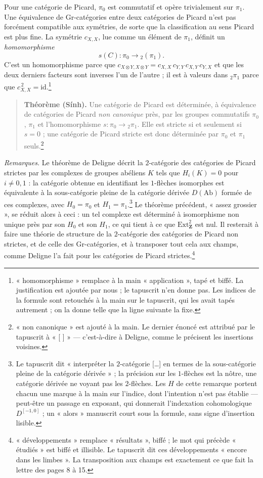 \documentclass[11pt,a4paper]{article}
\begin{document}
Pour une catégorie de Picard, $\pi_0$ est commutatif et opère trivialement
sur $\pi_1$. Une équivalence de Gr-catégories entre deux catégories de Picard
n'est pas forcément compatible aux symétries, de sorte que la classification
au sens Picard est plus fine. La symétrie $c_{X,X}$, lue comme un élément de
$\pi_1$, définit un \emph{homomorphisme}
\[ s(C) : \pi_0 \longrightarrow {}_2(\pi_1) . \]
C'est un homomorphisme parce que
$c_{X \otimes Y, X \otimes Y} = c_{X,X}\, c_{Y,Y}\, c_{X,Y}\, c_{Y,X}$ et que
les deux derniers facteurs sont inverses l'un de l'autre ; il est à valeurs
dans ${}_2\pi_1$ parce que $c_{X,X}^{\,2} = \mathrm{id}$.\footnote{« homomorphisme »
remplace à la main « application », tapé et biffé. La justification est
ajoutée par nous ; le tapuscrit n'en donne pas. Les indices de la formule
sont retouchés à la main sur le tapuscrit, qui les avait tapés autrement ; on
la donne telle que la ligne suivante la fixe.}

\begin{quote}
\textbf{Théorème (Sính).} Une catégorie de Picard est déterminée, à
équivalence de catégories de Picard \emph{non canonique} près, par les groupes
commutatifs $\pi_0$, $\pi_1$ et l'homomorphisme $s : \pi_0 \to {}_2\pi_1$.
Elle est stricte si et seulement si $s = 0$ ; une catégorie de Picard stricte
est donc déterminée par $\pi_0$ et $\pi_1$ seuls.\footnote{« non canonique »
est ajouté à la main. Le dernier énoncé est attribué par le tapuscrit à
« [ ] » --- c'est-à-dire à Deligne, comme le précisent les insertions
voisines.}
\end{quote}

\emph{Remarques.} Le théorème de Deligne décrit la $2$-catégorie des catégories
de Picard strictes par les complexes de groupes abéliens $K$ tels que
$H_i(K) = 0$ pour $i \neq 0, 1$ : la catégorie obtenue en identifiant les
$1$-flèches isomorphes est équivalente à la sous-catégorie pleine de la
catégorie dérivée $D(\mathrm{Ab})$ formée de ces complexes, avec
$H_0 = \pi_0$ et $H_1 = \pi_1$.\footnote{Le tapuscrit dit « interpréter la
$2$-catégorie […] en termes de la sous-catégorie pleine de la catégorie
dérivée » ; la précision sur les $1$-flèches est la nôtre, une catégorie
dérivée ne voyant pas les $2$-flèches. Les $H$ de cette remarque portent
chacun une marque à la main sur l'indice, dont l'intention n'est pas établie
--- peut-être un passage en exposant, qui donnerait l'indexation
cohomologique $D^{[-1,0]}$ ; un « alors » manuscrit court sous la formule,
sans signe d'insertion lisible.} Le théorème précédent, « assez grossier »,
se réduit alors à ceci : un tel complexe est déterminé à isomorphisme non
unique près par son $H_0$ et son $H_1$, ce qui tient à ce que
$\mathrm{Ext}^2_{\mathbf{Z}}$ est nul. Il resterait à faire une théorie de
structure de la $2$-catégorie des catégories de Picard non strictes, et de
celle des Gr-catégories, et à transposer tout cela aux champs, comme Deligne
l'a fait pour les catégories de Picard strictes.\footnote{« développements »
remplace « résultats », biffé ; le mot qui précède « étudiés » est biffé et
illisible. Le tapuscrit dit ces développements « encore dans les limbes ». La
transposition aux champs est exactement ce que fait la lettre des pages 8 à
15.}
\end{document}
